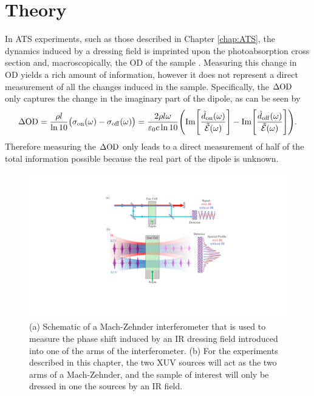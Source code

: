 \section{Theory}
\label{sec:ats_theory}
In ATS experiments, such as those described in Chapter \ref{chap:ATS}, the dynamics induced by a dressing field is imprinted upon the photoabsorption cross section and, macroscopically, the OD of the sample \cite{wuTheoryStrongfieldAttosecond2016,geneauxromainTransientAbsorptionSpectroscopy2019}.  Measuring this change in OD yields a rich amount of information, however it does not represent a direct measurement of all the changes induced in the sample.  Specifically, the $\Delta\mathrm{OD}$ only captures the change in the imaginary part of the dipole, as can be seen by
\begin{equation}
	\Delta\mathrm{OD} = \frac{\rho l}{\ln 10}\big(\sigma_{\mathrm{on}}(\omega) - \sigma_{\mathrm{off}}(\omega)\big) = \frac{2\rho l \omega}{\varepsilon_{0} c \ln 10}\Bigg( \mathrm{Im}\Bigg[\frac{\tilde{d}_{\mathrm{on}}(\omega)}{\tilde{\mathcal{E}}(\omega)}\Bigg] - \mathrm{Im}\Bigg[\frac{\tilde{d}_{\mathrm{off}}(\omega)}{\tilde{\mathcal{E}}(\omega)}\Bigg] \Bigg).
\end{equation}
Therefore measuring the $\Delta\mathrm{OD}$ only leads to a direct measurement of half of the total information possible because the real part of the dipole is unknown.  
\begin{figure}
	\centering
	\includegraphics[width=1.0\textwidth]{figures/CATS/CATS_mach_zehnder.pdf}
	\caption[Schematic of Mach-Zehnder interferometer and spatial profile with and without an IR dressing field in one arm of the interferometer]{(a) Schematic of a Mach-Zehnder interferometer that is used to measure the phase shift induced by an IR dressing field introduced into one of the arms of the interferometer. (b) For the experiments described in this chapter, the two XUV sources will act as the two arms of a Mach-Zehnder, and the sample of interest will only be dressed in one the sources by an IR field.}
	\label{fig:CATS_mach-zehnder_interferometer}
\end{figure}

